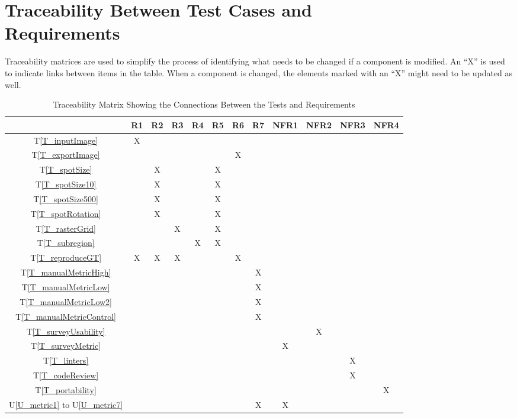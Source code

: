 \documentclass[12pt, titlepage]{article}
\newcommand{\tref}[1]{T\ref{#1}}
\newcommand{\utref}[1]{U\ref{#1}}
\begin{document}
\newpage
\clearpage

\section{Traceability Between Test Cases and \\ Requirements}
Traceability matrices are used to simplify the process of identifying what needs to be changed 
if a component is modified. An ``X'' is used to indicate links between items in the table. 
When a component is changed, the elements marked with an ``X'' might need to be updated as well.

\begin{table}[h!]
  \centering
  \begin{tabular}{|c|c|c|c|c|c|c|c|c|c|c|c|}
  \hline
    & R1
    & R2
    & R3
    & R4
    & R5
    & R6
    & R7
    & NFR1
    & NFR2
    & NFR3
    & NFR4
  \\ \hline
  \tref{T_inputImage}           &X& & & & & & & & & & \\ \hline
  \tref{T_exportImage}          & & & & & &X& & & & & \\ \hline
  \tref{T_spotSize}             & &X& & &X& & & & & & \\ \hline
  \tref{T_spotSize10}           & &X& & &X& & & & & & \\ \hline
  \tref{T_spotSize500}          & &X& & &X& & & & & & \\ \hline
  \tref{T_spotRotation}         & &X& & &X& & & & & & \\ \hline
  \tref{T_rasterGrid}           & & &X& &X& & & & & & \\ \hline
  \tref{T_subregion}            & & & &X&X& & & & & & \\ \hline
  \tref{T_reproduceGT}          &X&X&X& & &X& & & & & \\ \hline
  \tref{T_manualMetricHigh}     & & & & & & &X& & & & \\ \hline
  \tref{T_manualMetricLow}      & & & & & & &X& & & & \\ \hline
  \tref{T_manualMetricLow2}     & & & & & & &X& & & & \\ \hline
  \tref{T_manualMetricControl}  & & & & & & &X& & & & \\ \hline
  \tref{T_surveyUsability}      & & & & & & & & &X& & \\ \hline
  \tref{T_surveyMetric}         & & & & & & & &X& & & \\ \hline
  \tref{T_linters}              & & & & & & & & & &X& \\ \hline
  \tref{T_codeReview}           & & & & & & & & & &X& \\ \hline
  \tref{T_portability}          & & & & & & & & & & &X\\ \hline
  \utref{U_metric1} to \utref{U_metric7} & & & & & & &X&X& & & \\ \hline
  \end{tabular}
  \caption{Traceability Matrix Showing the Connections Between the Tests and Requirements}
  \label{Table:A_trace}
\end{table}
\end{document}
